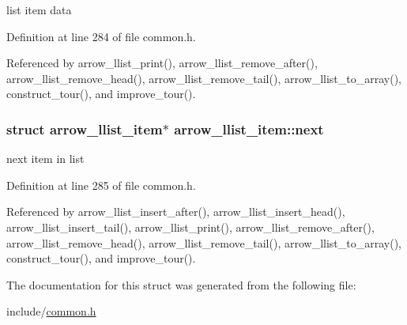 list item data 

Definition at line 284 of file common.h.

Referenced by arrow\_\-llist\_\-print(), arrow\_\-llist\_\-remove\_\-after(), arrow\_\-llist\_\-remove\_\-head(), arrow\_\-llist\_\-remove\_\-tail(), arrow\_\-llist\_\-to\_\-array(), construct\_\-tour(), and improve\_\-tour().\hypertarget{structarrow__llist__item_81a998b260ab022b05f1ff572327b871}{
\subsubsection[{next}]{\setlength{\rightskip}{0pt plus 5cm}struct {\bf arrow\_\-llist\_\-item}$\ast$ {\bf arrow\_\-llist\_\-item::next}}}
\label{structarrow__llist__item_81a998b260ab022b05f1ff572327b871}


next item in list 

Definition at line 285 of file common.h.

Referenced by arrow\_\-llist\_\-insert\_\-after(), arrow\_\-llist\_\-insert\_\-head(), arrow\_\-llist\_\-insert\_\-tail(), arrow\_\-llist\_\-print(), arrow\_\-llist\_\-remove\_\-after(), arrow\_\-llist\_\-remove\_\-head(), arrow\_\-llist\_\-remove\_\-tail(), arrow\_\-llist\_\-to\_\-array(), construct\_\-tour(), and improve\_\-tour().

The documentation for this struct was generated from the following file:\begin{CompactItemize}
\item 
include/\hyperlink{common_8h}{common.h}\end{CompactItemize}

